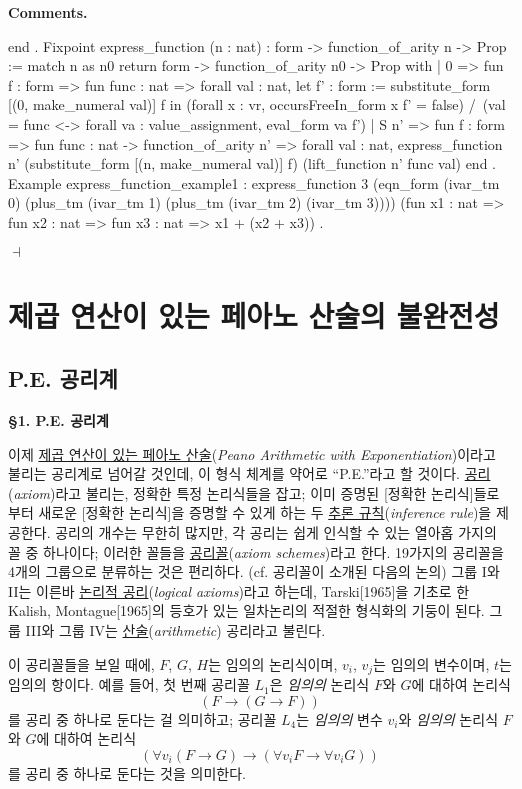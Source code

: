 \documentclass[12pt]{paper}
\newenvironment{context}[1][]
{ \noindent \textbf{{#1}.}
}
{ \hfill $ \dashv $
}
\begin{document}
\begin{context}[Comments]
\begin{coqcode}
  end
.
Fixpoint express_function (n : nat) : form -> function_of_arity n -> Prop :=
  match n as n0 return form -> function_of_arity n0 -> Prop with
  | 0 =>
    fun f : form =>
    fun func : nat =>
    forall val : nat,
    let f' : form := substitute_form [(0, make_numeral val)] f in
    (forall x : vr, occursFreeIn_form x f' = false) /\ (val = func <-> forall va : value_assignment, eval_form va f')
  | S n' =>
    fun f : form =>
    fun func : nat -> function_of_arity n' =>
    forall val : nat, express_function n' (substitute_form [(n, make_numeral val)] f) (lift_function n' func val)
  end
.
Example express_function_example1 :
  express_function 3 (eqn_form (ivar_tm 0) (plus_tm (ivar_tm 1) (plus_tm (ivar_tm 2) (ivar_tm 3)))) (fun x1 : nat => fun x2 : nat => fun x3 : nat => x1 + (x2 + x3))
.
    \end{coqcode}
  \end{context}

  \section{제곱 연산이 있는 페아노 산술의 불완전성}

  \subsection{P.E. 공리계}

  \textbf{\S1. P.E. 공리계}

  이제 \underline{제곱 연산이 있는 페아노 산술}(\textit{Peano Arithmetic with Exponentiation})이라고 불리는 공리계로 넘어갈 것인데,
  이 형식 체계를 약어로 ``P.E.''라고 할 것이다.
  \underline{공리}(\textit{axiom})라고 불리는, 정확한 특정 논리식들을 잡고;
  이미 증명된 [정확한 논리식]들로부터 새로운 [정확한 논리식]을 증명할 수 있게 하는 두 \underline{추론 규칙}(\textit{inference rule})을 제공한다.
  공리의 개수는 무한히 많지만,
  각 공리는 쉽게 인식할 수 있는 열아홉 가지의 꼴 중 하나이다;
  이러한 꼴들을 \underline{공리꼴}(\textit{axiom schemes})라고 한다.
  19가지의 공리꼴을 4개의 그룹으로 분류하는 것은 편리하다. (cf. 공리꼴이 소개된 다음의 논의)
  그룹 I와 II는 이른바 \underline{논리적 공리}(\textit{logical axioms})라고 하는데,
  Tarski[1965]을 기초로 한 Kalish, Montague[1965]의 등호가 있는 일차논리의 적절한 형식화의 기둥이 된다.
  그룹 III와 그룹 IV는 \underline{산술}(\textit{arithmetic}) 공리라고 불린다.

  이 공리꼴들을 보일 때에,
  $F$, $G$, $H$는 임의의 논리식이며,
  $v_i$, $v_j$는 임의의 변수이며,
  $t$는 임의의 항이다.
  예를 들어, 첫 번째 공리꼴 $L_1$은 \textit{임의의} 논리식 $F$와 $G$에 대하여 논리식 $$\left( F \rightarrow \left( G \rightarrow F \right) \right)$$를 공리 중 하나로 둔다는 걸 의미하고;
  공리꼴 $L_4$는 \textit{임의의} 변수 $v_i$와 \textit{임의의} 논리식 $F$와 $G$에 대하여 논리식 $$\left( \forall v_i \left( F \rightarrow G \right) \rightarrow \left( \forall v_i F \rightarrow \forall v_i G \right) \right)$$를 공리 중 하나로 둔다는 것을 의미한다.
\end{document}

